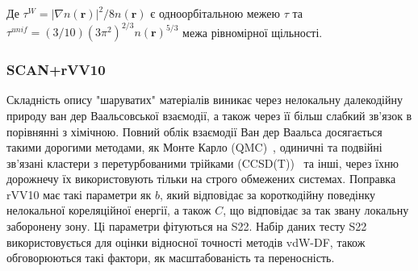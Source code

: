 Де $\tau^W = |\nabla{n(\textbf{r})}|^2/8n(\textbf{r})$ є одноорбітальною межею $\tau$ \newline та $\tau^{unif} = (3/10)(3\pi^2)^{2/3}n(\textbf{r})^{5/3}$ межа рівномірної щільності.
\subsubsection{SCAN+rVV10}
Складність опису "шаруватих" матеріалів виникає через нелокальну далекодійну природу ван дер Ваальсовської взаємодії, а також через її більш слабкий зв'язок в порівнянні з хімічною. Повний облік взаємодії Ван дер Ваальса досягається такими дорогими методами, як Монте Карло (QMC)~\cite{QMC}, одиничні та подвійні зв'язані кластери з перетурбованими трійками (CCSD(T))~\cite{CCSD(T)} та інші, через їхню дорожнечу їх використовують тільки на строго обмежених системах. Поправка rVV10 має такі параметри як $b$, який відповідає за короткодійну поведінку нелокальної кореляційної енергії, а також $C$, що відповідає за так звану локальну заборонену зону. Ці параметри фітуються на S22. Набір даних тесту S22~\cite{S22} використовується для оцінки відносної точності методів vdW-DF, також обговорюються такі фактори, як масштабованість та переносність.